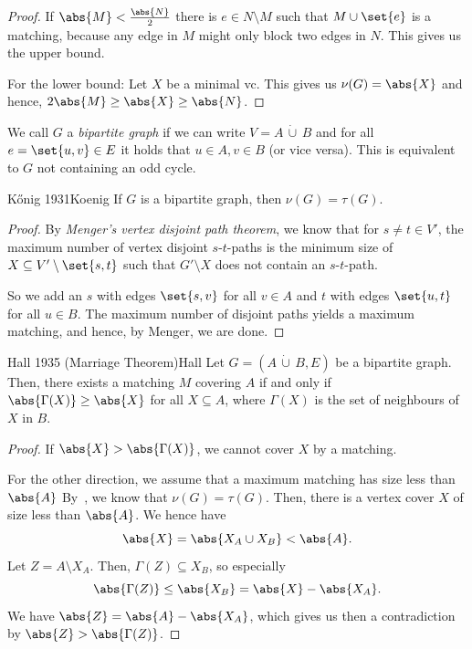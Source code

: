 \documentclass[language=english,algolist,acrolist]{TemplateLecture}
\begin{document}
\begin{proof}
    If $\abs{M} < \frac{\abs{N}}{2}$ there is $e \in N \setminus M$ such that $M \cup \set{e}$ is a matching, because any edge in $M$ might only block two edges in $N$. This gives us the upper bound.

    For the lower bound: Let $X$ be a minimal \ac{vc}. This gives us $\nu(G) = \abs{X}$ and hence, $2\abs{M} \geq \abs{X} \geq \abs{N}$.
\end{proof}

We call $G$ a \emph{bipartite graph} if we can write $V = A\, \dot{\cup}\, B$ and for all $e = \set{u,v} \in E$ it holds that $u \in A, v \in B$ (or vice versa). This is equivalent to $G$ not containing an odd cycle.

\begin{thm}{K\H{o}nig 1931}{Koenig}
    If $G$ is a bipartite graph, then $\nu(G) = \tau(G)$.
\end{thm}

\begin{proof}
    By \emph{Menger's vertex disjoint path theorem}, we know that for $s \neq t \in V'$, the maximum number of vertex disjoint $s$-$t$-paths is the minimum size of $X \subseteq V' \setminus \set{s,t}$ such that $G' \setminus X$ does not contain an $s$-$t$-path. 
    
    So we add an $s$ with edges $\set{s, v}$ for all $v \in A$ and $t$ with edges $\set{u, t}$ for all $u \in B$. The maximum number of disjoint paths yields a maximum matching, and hence, by Menger, we are done.
\end{proof}

\begin{thm}{Hall 1935 (Marriage Theorem)}{Hall}
    Let $G = (A\, \dot{\cup}\, B, E)$ be a bipartite graph. Then, there exists a matching $M$ covering $A$ if and only if $\abs{\Gamma(X)} \geq \abs{X}$ for all $X \subseteq A$, where $\Gamma(X)$ is the set of neighbours of $X$ in $B$.
\end{thm}

\begin{proof}
    If $\abs{X} > \abs{\Gamma(X)}$, we cannot cover $X$ by a matching.

    For the other direction, we assume that a maximum matching has size less than $\abs{A}$ By~, we know that $\nu(G) = \tau(G)$. Then, there is a vertex cover $X$ of size less than $\abs{A}$. We hence have 
    \begin{equation*}
        \abs{X} = \abs{X_A \cup X_B} < \abs{A}.
    \end{equation*}
    Let $Z = A \setminus X_A$. Then, $\Gamma(Z) \subseteq X_B$, so especially 
    \begin{equation*}
        \abs{\Gamma(Z)} \leq \abs{X_B} = \abs{X} - \abs{X_A}.
    \end{equation*}
    We have $\abs{Z} = \abs{A} - \abs{X_A}$, which gives us then a contradiction by $\abs{Z} > \abs{\Gamma(Z)}$.
\end{proof}
\end{document}
